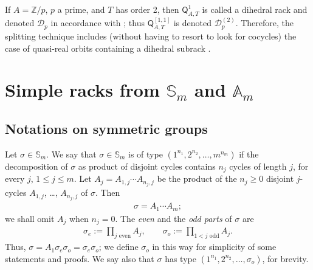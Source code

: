 \documentclass[11pt]{amsart} \textheight 22cm
\newcommand\sigmae{\sigma_{e}}
\newcommand\sigmao{\sigma_{o}}
\newcommand\so{\sigmao}
\renewcommand{\^}[1]{\mbox{$^{\left( #1 \right)}$}}
\renewcommand{\_}[1]{\mbox{$_{\left( #1 \right)}$}}
\newcommand{\Z}{{\mathbb Z}}
\newcommand{\Q}{{\mathsf Q}}
\newcommand{\D}{{\mathcal D}}
\theoremstyle{plain}
\theoremstyle{definition}
\theoremstyle{remark}
\newcommand\am{\mathbb A_m}
\newcommand\sm{\mathbb S_m}
\theoremstyle{remark}
\begin{document}
If $A = \Z/p$, $p$ a prime, and $T$ has order 2, then $\Q_{A, T}^{1}$ is
called a dihedral rack and denoted
$\D_p$ in accordance with \cite[Def. 2.2]{AF3}; thus $\Q_{A,T}^{[1,1]}$
is denoted $\D_p^{(2)}$.
Therefore, the splitting technique includes (without having to resort to look for
cocycles) the case of quasi-real orbits containing  a dihedral
subrack \cite[Cor. 2.9]{AF3}.






\section{Simple racks from $\sm$ and $\am$}\label{section:racks-caen}
\subsection{Notations on symmetric
groups}\label{subsect:sm} Let $\sigma\in \mathbb S_m$. We say that
$\sigma \in \mathbb S_m$ is of type
$(1^{n_1},2^{n_2},\dots,m^{n_m})$ if the decomposition of $\sigma$
as product of disjoint cycles contains $n_j$ cycles of length $j$,
for every $j$, $1\leq j \leq m$. Let $A_j=A_{1,j} \cdots
A_{n_j,j}$ be the product of the $n_j \geq 0$ disjoint $j$-cycles
$A_{1,j}$, \dots, $A_{n_j,j}$ of $\sigma$. Then
\begin{align}\label{eqn:descomp}
    \sigma=A_1 \cdots A_m;
\end{align}
we shall omit $A_j$ when $n_j =0$. The \emph{even} and the
\emph{odd parts} of $\sigma$ are
\begin{align}\label{sigma:even:odd}
    \sigmae:=\prod_{j \text{ even}}A_j,
        \qquad \sigma_{o}:=\prod_{1 < j \text{ odd}}A_j.
\end{align}
Thus, $\sigma = A_1\sigmae \sigma_{o} = \sigmae \sigma_{o}$; we define $\sigma_{o}$ in this
way for simplicity of some statements and proofs. We say also that $\sigma$ has type
$(1^{n_1}, 2^{n_2}, \dots, \so)$, for brevity.

\end{document}
